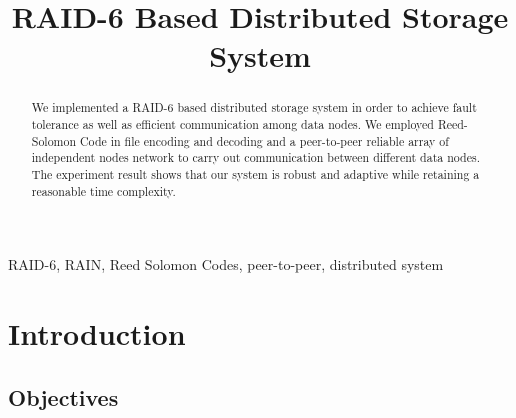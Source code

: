 \documentclass[conference]{IEEEtran}
\begin{document}
\title{RAID-6 Based Distributed Storage System}

\author{

\and
{}
\and
{}
}

\maketitle

\begin{abstract}
We implemented a RAID-6 based distributed storage system in order to achieve fault tolerance as well as efficient communication among data nodes. We employed Reed-Solomon Code in file encoding and decoding and a peer-to-peer reliable array of independent nodes network to carry out communication between different data nodes. The experiment result shows that our system is robust and adaptive while retaining a reasonable time complexity.
\end{abstract}

\begin{IEEEkeywords}
RAID-6, RAIN, Reed Solomon Codes, peer-to-peer, distributed system
\end{IEEEkeywords}

\section{Introduction}

\subsection{Objectives}\label{sec:intro}
\end{document}
